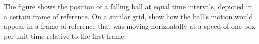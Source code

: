         The figure shows the position of a falling ball at equal time intervals,
        depicted in a certain frame of reference.
        On a similar grid, show how the ball's motion would appear in a frame of
        reference that was moving horizontally at a speed of one box per
        unit time relative to the first frame.
